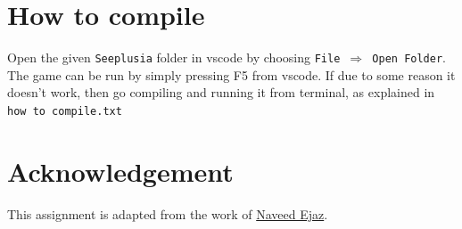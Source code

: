 \documentclass[a4paper,12pt]{article}
\begin{document}
\section{How to compile}
Open the given \texttt{Seeplusia} folder in vscode by choosing \texttt{File $\Rightarrow$ Open Folder}. The game can be run by simply pressing F5 from vscode. If due to some reason it doesn't work, then go compiling and running it from terminal, as explained in \texttt{how to compile.txt}


\section{Acknowledgement}
This assignment is adapted from the work of  \href{https://twitter.com/nav_ejaz}{Naveed Ejaz}.	
	
	
\end{document}
